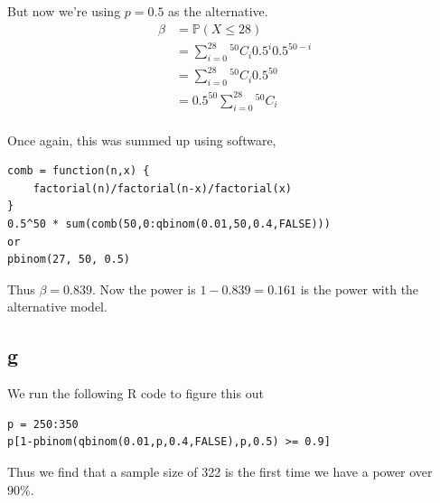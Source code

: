 \documentclass{article}
\newcommand{\prob}{\mathbb{P}}
\begin{document}
But now we're using $p=0.5$ as the alternative.
\begin{align*}
    \beta &= \prob(X \leq 28) \\
    &= \sum_{i=0}^{28} {}^{50}C_i 0.5^i 0.5^{50-i} \\
    &= \sum_{i=0}^{28} {}^{50}C_i 0.5^{50} \\
    &= 0.5^{50} \sum_{i=0}^{28} {}^{50}C_i \\
\end{align*}

Once again, this was summed up using software,
\begin{verbatim}
comb = function(n,x) {
    factorial(n)/factorial(n-x)/factorial(x)
}
0.5^50 * sum(comb(50,0:qbinom(0.01,50,0.4,FALSE)))
or
pbinom(27, 50, 0.5)
\end{verbatim}

Thus $\beta = 0.839$. Now the power is $1-0.839=0.161$ 
is the power with the alternative model.

\subsection{g}
We run the following R code to figure this out
\begin{verbatim}
p = 250:350
p[1-pbinom(qbinom(0.01,p,0.4,FALSE),p,0.5) >= 0.9]
\end{verbatim}

Thus we find that a sample size of 322 is the first time we have a power over
90\%.
\end{document}
